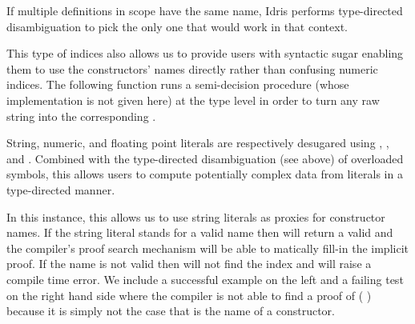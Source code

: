\begin{remark}
  If multiple definitions in scope have the same name,
  Idris performs type-directed disambiguation to pick
  the only one that would work in that context.
\end{remark}

This type of indices also allows us to provide users with
syntactic sugar enabling them to use the constructors' names
directly rather than confusing numeric indices.
%
The following function runs a semi-decision procedure
 (whose implementation is
not given here) at the type level
in order to turn any raw string 
into the corresponding .


\begin{remark}
  String, numeric, and floating point literals are respectively
  desugared using , , and
  .
  Combined with the type-directed disambiguation (see above)
  of overloaded symbols, this allows users to compute potentially complex
  data from literals in a type-directed manner.
\end{remark}

In this instance, this allows us to use string literals as
proxies for constructor names.
%
If the string literal stands for a valid name then
 will
return a valid  and the compiler's proof
search mechanism will be able to
matically fill-in the implicit proof.
%
If the name is not valid then \idris{} will not
find the index and will raise a compile time error.
%
We include a successful example on the left and a failing test
on the right hand side where the compiler is not able to find
a proof of ( \IdrisKeyword{(}
 
\IdrisKeyword{)}) because it is
simply not the case that  is the
name of a  constructor.

\noindent
\begin{minipage}[t]{0.35\textwidth}
\end{minipage}\hfill
\begin{minipage}[t]{0.52\textwidth}
\end{minipage}

